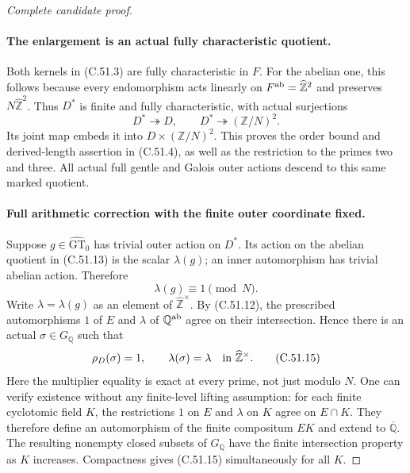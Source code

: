 \begin{proof}[Complete candidate proof]
\paragraph{The enlargement is an actual fully characteristic quotient.}
Both kernels in (C.51.3) are fully characteristic in $F$.
For the abelian one, this follows because every endomorphism acts
linearly on $F^{\rm ab}=\widehat{\mathbb Z}^2$ and preserves
$N\widehat{\mathbb Z}^2$. Thus $D^*$ is finite and fully
characteristic, with actual surjections
\[
              D^*\twoheadrightarrow D,\qquad
              D^*\twoheadrightarrow(\mathbb Z/N)^2.
                                                        \tag{C.51.13}
\]
Its joint map embeds it into $D\times(\mathbb Z/N)^2$.
This proves the order bound and derived-length assertion in
(C.51.4), as well as the restriction to the primes two and three.
All actual full gentle and Galois outer actions descend to this
same marked quotient.

\paragraph{Full arithmetic correction with the finite outer coordinate fixed.}
Suppose $g\in\widehat{\mathrm{GT}}_0$ has trivial outer action
on $D^*$. Its action on the abelian quotient in (C.51.13) is
the scalar $\lambda(g)$; an inner automorphism has trivial
abelian action. Therefore
\[
                         \lambda(g)\equiv1\pmod N.
                                                        \tag{C.51.14}
\]
Write $\lambda=\lambda(g)$ as an element of
$\widehat{\mathbb Z}^{\times}$. By (C.51.12), the prescribed
automorphisms $1$ of $E$ and $\lambda$ of $\mathbb Q^{\rm ab}$
agree on their intersection. Hence there is an actual
$\sigma\in G_{\mathbb Q}$ such that
\[
                   \rho_D(\sigma)=1,\qquad
                   \lambda(\sigma)=\lambda
                   \quad\hbox{in }\widehat{\mathbb Z}^{\times}.
                                                        \tag{C.51.15}
\]
Here the multiplier equality is exact at every prime, not just
modulo $N$. One can verify existence without any finite-level
lifting assumption: for each finite cyclotomic field $K$, the
restrictions $1$ on $E$ and $\lambda$ on $K$ agree on $E\cap K$.
They therefore define an automorphism of the finite compositum
$EK$ and extend to $\overline{\mathbb Q}$. The resulting nonempty
closed subsets of $G_{\mathbb Q}$ have the finite intersection
property as $K$ increases. Compactness gives (C.51.15)
simultaneously for all $K$.


\end{proof}
